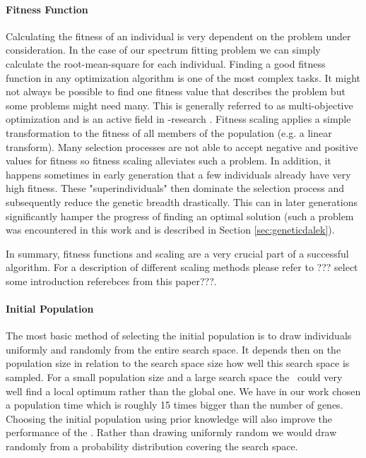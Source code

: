 \paragraph{Fitness Function}
Calculating the fitness of an individual is very dependent on the problem under consideration. In the case of our spectrum fitting problem we can simply calculate the root-mean-square for each individual. Finding a good fitness function in any optimization algorithm is one of the most complex tasks. It might not always be possible to find one fitness value that describes the problem but some problems might need many. This is generally referred to as multi-objective optimization and is an active field in \ga-research \citep{citeulike:1300532}. Fitness scaling applies a simple transformation to the fitness of all members of the population (e.g. a linear transform). Many selection processes are not able to accept negative and positive values for fitness so fitness scaling alleviates such a problem. In addition, it happens sometimes in early generation that a few individuals already have very high fitness. These "superindividuals" then dominate the selection process and subsequently reduce the genetic breadth  drastically. This can in later generations significantly hamper the progress of finding an optimal solution (such a problem was encountered in this work and is described in Section \ref{sec:geneticdalek}). 

In summary, fitness functions and scaling are a very crucial part of a successful algorithm. For a description of different scaling methods please refer to \citet{Kreinovich93geneticalgorithms} ??? select some introduction referebces from this paper???.

\paragraph{Initial Population}
The most basic method of selecting the initial population is to draw individuals uniformly and randomly from the entire search space. It depends then on the population size in relation to the search space size how well this search space is sampled. For a small population size and a large search space the \ga\ could very well find a local optimum rather than the global one. We have in our work chosen a population time which is roughly 15 times bigger than the number of genes. Choosing the initial population using prior knowledge will also improve the performance of the \ga. Rather than drawing uniformly random we would draw randomly from a probability distribution covering the search space. 

